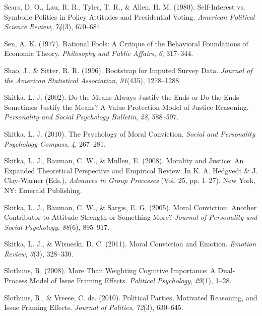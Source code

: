 \documentclass[12pt,econ]{sources/authesis}
\begin{document}
\leavevmode\hypertarget{ref-sears_self-interest_1980}{}%
Sears, D. O., Lau, R. R., Tyler, T. R., \& Allen, H. M. (1980). Self-Interest vs. Symbolic Politics in Policy Attitudes and Presidential Voting. \emph{American Political Science Review}, \emph{74}(3), 670--684.

\leavevmode\hypertarget{ref-sen_rational_1977}{}%
Sen, A. K. (1977). Rational Fools: A Critique of the Behavioral Foundations of Economic Theory. \emph{Philosophy and Public Affairs}, \emph{6}, 317--344.

\leavevmode\hypertarget{ref-shao_1996_bootstrap}{}%
Shao, J., \& Sitter, R. R. (1996). Bootstrap for Imputed Survey Data. \emph{Journal of the American Statistical Association}, \emph{91}(435), 1278--1288.

\leavevmode\hypertarget{ref-skitka_2002_means}{}%
Skitka, L. J. (2002). Do the Means Always Justify the Ends or Do the Ends Sometimes Justify the Means? A Value Protection Model of Justice Reasoning. \emph{Personality and Social Psychology Bulletin}, \emph{28}, 588--597.

\leavevmode\hypertarget{ref-skitka_psychology_2010}{}%
Skitka, L. J. (2010). The Psychology of Moral Conviction. \emph{Social and Personality Psychology Compass}, \emph{4}, 267--281.

\leavevmode\hypertarget{ref-skitka_2008_morality}{}%
Skitka, L. J., Bauman, C. W., \& Mullen, E. (2008). Morality and Justice: An Expanded Theoretical Perspective and Empirical Review. In K. A. Hedgvedt \& J. Clay-Warner (Eds.), \emph{Advances in Group Processes} (Vol. 25, pp. 1--27). New York, NY: Emerald Publishing.

\leavevmode\hypertarget{ref-skitka_moral_2005}{}%
Skitka, L. J., Bauman, C. W., \& Sargis, E. G. (2005). Moral Conviction: Another Contributor to Attitude Strength or Something More? \emph{Journal of Personality and Social Psychology}, \emph{88}(6), 895--917.

\leavevmode\hypertarget{ref-skitka_moral_2011}{}%
Skitka, L. J., \& Wisneski, D. C. (2011). Moral Conviction and Emotion. \emph{Emotion Review}, \emph{3}(3), 328--330.

\leavevmode\hypertarget{ref-slothuus_more_2008}{}%
Slothuus, R. (2008). More Than Weighting Cognitive Importance: A Dual-Process Model of Issue Framing Effects. \emph{Political Psychology}, \emph{29}(1), 1--28.

\leavevmode\hypertarget{ref-slothuus_political_2010}{}%
Slothuus, R., \& Vreese, C. de. (2010). Political Parties, Motivated Reasoning, and Issue Framing Effects. \emph{Journal of Politics}, \emph{72}(3), 630--645.
\end{document}
